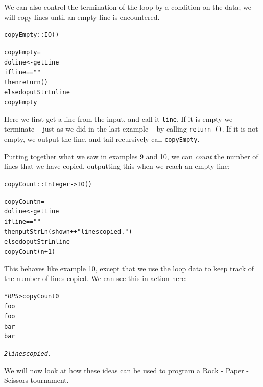 \begin{example}
 We can also control the termination of the loop by a condition on the data; we will copy lines until an empty line is encountered.
\begin{alltt}
copyEmpty :: IO ()

copyEmpty =
    do line <- getLine 
       if line == ""
          then return ()
          else do putStrLn line
                  copyEmpty
\end{alltt}
Here we first get a line from the input, and call it \texttt{line}. If it is empty we terminate -- just as we did in the last example -- by calling \texttt{return ()}. If it is not empty, we output the line, and tail-recursively call \texttt{copyEmpty}.

Putting together what we saw in examples 9 and 10, we can \emph{count} the number of lines that we have copied, outputting this when we reach an empty line:
\begin{alltt}
copyCount :: Integer -> IO ()

copyCount n =
    do line <- getLine 
       if line == ""
          then putStrLn (show n ++ " lines copied.")
          else do putStrLn line
                  copyCount (n+1)
\end{alltt}
This behaves like example 10, except that we use the loop data to keep track of the number of lines copied. We can see this in action here:
\begin{alltt}
\textsl{*RPS>} copyCount 0
foo
foo
bar
bar

\textsl{2 lines copied.}
\end{alltt}

\end{example}

We will now look at how these ideas can be used to program a Rock - Paper - Scissors tournament.

